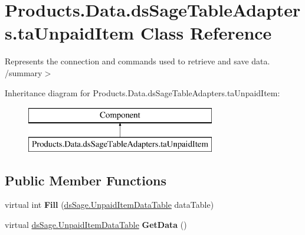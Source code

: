 \hypertarget{class_products_1_1_data_1_1ds_sage_table_adapters_1_1ta_unpaid_item}{}\section{Products.\+Data.\+ds\+Sage\+Table\+Adapters.\+ta\+Unpaid\+Item Class Reference}
\label{class_products_1_1_data_1_1ds_sage_table_adapters_1_1ta_unpaid_item}


Represents the connection and commands used to retrieve and save data. /summary$>$  


Inheritance diagram for Products.\+Data.\+ds\+Sage\+Table\+Adapters.\+ta\+Unpaid\+Item\+:\begin{figure}[H]
\begin{center}
\leavevmode
\includegraphics[height=2.000000cm]{class_products_1_1_data_1_1ds_sage_table_adapters_1_1ta_unpaid_item}
\end{center}
\end{figure}
\subsection*{Public Member Functions}
\begin{DoxyCompactItemize}
\item 
virtual int {\bfseries Fill} (\hyperlink{class_products_1_1_data_1_1ds_sage_1_1_unpaid_item_data_table}{ds\+Sage.\+Unpaid\+Item\+Data\+Table} data\+Table)\hypertarget{class_products_1_1_data_1_1ds_sage_table_adapters_1_1ta_unpaid_item_a657d397dae48946cf506651b68345f48}{}\label{class_products_1_1_data_1_1ds_sage_table_adapters_1_1ta_unpaid_item_a657d397dae48946cf506651b68345f48}

\item 
virtual \hyperlink{class_products_1_1_data_1_1ds_sage_1_1_unpaid_item_data_table}{ds\+Sage.\+Unpaid\+Item\+Data\+Table} {\bfseries Get\+Data} ()\hypertarget{class_products_1_1_data_1_1ds_sage_table_adapters_1_1ta_unpaid_item_aedd607b375f8e256494afa342318b9a8}{}\label{class_products_1_1_data_1_1ds_sage_table_adapters_1_1ta_unpaid_item_aedd607b375f8e256494afa342318b9a8}

\end{DoxyCompactItemize}
